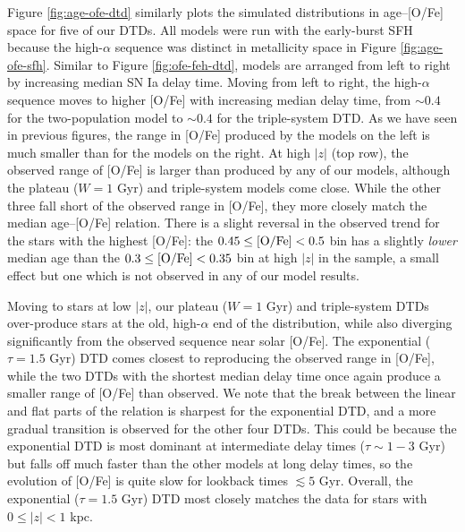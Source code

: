 \documentclass[twocolumn,twocolappendix,linenumbers,trackchanges]{aastex631}
\begin{document}
Figure \ref{fig:age-ofe-dtd} similarly plots the simulated distributions in age--[O/Fe] space for five of our DTDs. All models were run with the early-burst SFH because the high-$\alpha$ sequence was distinct in metallicity space in Figure \ref{fig:age-ofe-sfh}. Similar to Figure \ref{fig:ofe-feh-dtd}, models are arranged from left to right by increasing median SN Ia delay time. Moving from left to right, the high-$\alpha$ sequence moves to higher [O/Fe] with increasing median delay time, from $\sim0.4$ for the two-population model to $\sim0.4$ for the triple-system DTD. As we have seen in previous figures, the range in [O/Fe] produced by the models on the left is much smaller than for the models on the right. At high $|z|$ (top row), the observed range of [O/Fe] is larger than produced by any of our models, although the plateau ($W=1$ Gyr) and triple-system models come close. While the other three fall short of the observed range in [O/Fe], they more closely match the median age--[O/Fe] relation. There is a slight reversal in the observed trend for the stars with the highest [O/Fe]: the $0.45\leq{\rm [O/Fe]}<0.5$ bin has a slightly \textit{lower} median age than the $0.3\leq{\rm [O/Fe]}<0.35$ bin at high $|z|$ in the  sample, a small effect but one which is not observed in any of our model results.

Moving to stars at low $|z|$, our plateau ($W=1$ Gyr) and triple-system DTDs over-produce stars at the old, high-$\alpha$ end of the distribution, while also diverging significantly from the observed sequence near solar [O/Fe]. The exponential ($\tau=1.5$ Gyr) DTD comes closest to reproducing the observed range in [O/Fe], while the two DTDs with the shortest median delay time once again produce a smaller range of [O/Fe] than observed. We note that the break between the linear and flat parts of the relation is sharpest for the exponential DTD, and a more gradual transition is observed for the other four DTDs. This could be because the exponential DTD is most dominant at intermediate delay times ($\tau\sim 1-3$ Gyr) but falls off much faster than the other models at long delay times, so the evolution of [O/Fe] is quite slow for lookback times $\lesssim 5$ Gyr. Overall, the exponential ($\tau=1.5$ Gyr) DTD most closely matches the data for stars with $0\leq|z|<1$ kpc.
\end{document}
